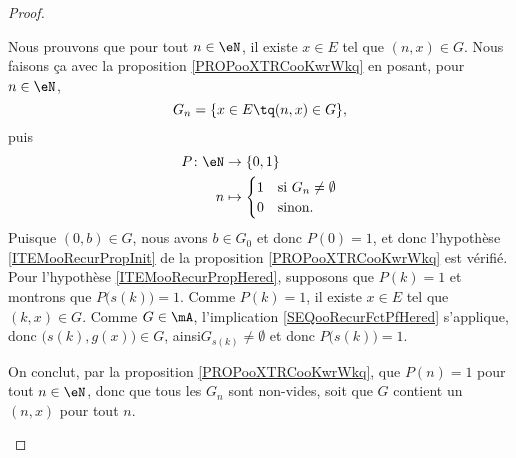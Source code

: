\begin{proof}
\begin{subproof}
  		Nous prouvons que pour tout \( n\in \eN\), il existe \( x\in E\) tel que \( (n,x)\in G\). Nous faisons ça avec la proposition \ref{PROPooXTRCooKwrWkq} en posant, pour \( n\in \eN\),
		\begin{equation}	\label{EQNooRecurFctEnsGn}
			G_n=\{ x\in E\tq (n,x)\in G \},
		\end{equation}
		puis
  	 	\begin{equation}
			\begin{aligned}
				P\colon \eN & \to \{ 0,1 \}                           \\
				n           & \mapsto \begin{cases}
					                      1 & \text{si } G_n\neq\emptyset \\
					                      0 & \text{sinon.}
				                      \end{cases}
			\end{aligned}
		\end{equation}
		Puisque \( (0,b) \in G\), nous avons \( b \in G_0\) et donc \( P(0) = 1\), et donc l'hypothèse \ref{ITEMooRecurPropInit} de la proposition \ref{PROPooXTRCooKwrWkq} est vérifié. Pour l'hypothèse \ref{ITEMooRecurPropHered}, supposons que \( P(k)=1\) et montrons que \( P\big( s(k) \big)=1\). Comme \( P(k)=1\), il existe \( x\in E\) tel que \( (k,x)\in G\). Comme \( G \in \mA \), l'implication \eqref{SEQooRecurFctPfHered} s'applique, donc \( \big( s(k),g(x) \big)\in G\), ainsi\( G_{s(k)}\neq \emptyset\) et donc \( P\big( s(k) \big)=1\).

  		On conclut, par la proposition \ref{PROPooXTRCooKwrWkq}, que \( P(n) = 1 \) pour tout \( n \in \eN \), donc que tous les \( G_n \) sont non-vides, soit que \( G\) contient un \( (n,x)\) pour tout \( n\).
	

\end{subproof}
\end{proof}
